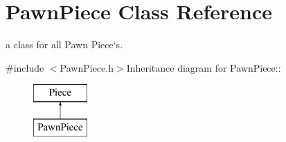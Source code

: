 \hypertarget{classPawnPiece}{
\section{PawnPiece Class Reference}
\label{classPawnPiece}
}


a class for all Pawn Piece`s.  


{\ttfamily \#include $<$PawnPiece.h$>$}Inheritance diagram for PawnPiece::\begin{figure}[H]
\begin{center}
\leavevmode
\includegraphics[height=2cm]{classPawnPiece}
\end{center}
\end{figure}
